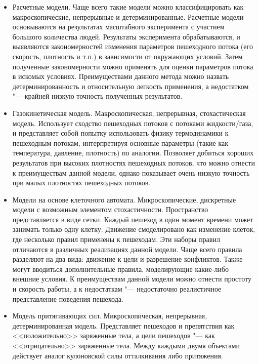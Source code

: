 \begin{itemize}
  \item Расчетные модели.
        Чаще всего такие модели можно классифицировать как макроскопические, непрерывные и детерминированные.
        Расчетные модели основываются на результатах масштабного эксперимента с участием большого количества людей.
        Результаты эксперимента обрабатываются, и выявляются закономерностей изменения параметров пешеходного потока (его скорость, плотность и т.п.) в зависимости от окружающих условий.
        Затем полученные закономерности можно применять для оценки параметров потока в искомых условиях.
        Преимуществами данного метода можно назвать детерминированность и относительную легкость применения, а недостатком "--- крайней низкую точность полученных результатов.
  \item Газокинетическая модель.
        Макроскопическая, непрерывная, стохастическая модель.
        Использует сходство пешеходных потоков с потоками жидкости/газа, и представляет собой попытку использовать физику термодинамики к пешеходным потокам,
        интерпретируя основные параметры (такие как температура, давление, плотность) по аналогии.
        Позволяет добиться хороших результатов при высоких плотностях пешеходных потоков, что можно отнести к преимуществам данной модели,
        однако показывает очень низкую точность при малых плотностях пешеходных потоков.
  \item Модели на основе клеточного автомата.
        Микроскопические, дискретные модели с возможным элементом стохастичности.
        Пространство представляется в виде сетки.  Каждый пешеход в один момент времени может занимать только одну клетку.
        Движение смоделировано как изменение клеток, где несколько правил применены к пешеходам. Эти наборы правил отличаются в различных реализациях данной модели.
        Чаще всего правила разделяют на два вида: движение к цели и разрешение конфликтов.
        Также могут вводиться дополнительные правила, моделирующие какие-либо внешние условия.
        К преимуществам данной модели можно отнести простоту и скорость работы, а к недостаткам "--- недостаточно реалистичное представление поведения пешехода.
  \item Модель притягивающих сил.
        Микроскопическая, непрерывная, детерминированная модель.
        Представляет пешеходов и препятствия как <<положительно>> заряженные тела, а цели пешеходов "--- как <<отрицательно>> заряженные тела.
        Между каждыми двумя объектами действует аналог кулоновской силы отталкивания либо притяжения.

\end{itemize}
